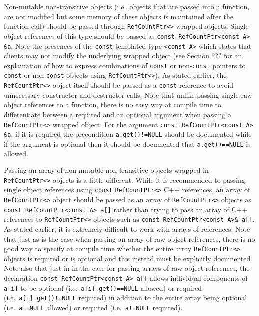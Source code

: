 Non-mutable non-transitive objects (i.e.~objects that are passed into
a function, are not modified but some memory of these objects is
maintained after the function call) should be passed through
{}\texttt{Ref\-Count\-Ptr<>} wrapped objects.  Single object
references of this type should be passed as {}\texttt{const
Ref\-Count\-Ptr<const A> \&a}.  Note the presences of the
{}\texttt{const} templated type {}\texttt{<const A>} which states that
clients may not modify the underlying wrapped object (see Section ???
for an explaination of how to express combinations of {}\texttt{const}
or non-{}\texttt{const} pointers to {}\texttt{const} or
non-{}\texttt{const} objects using {}\texttt{Ref\-Count\-Ptr<>}).  As
stated earlier, the {}\texttt{Ref\-Count\-Ptr<>} object itself should
be passed as a {}\texttt{const} reference to avoid unnecessary
constructor and destructor calls.  Note that unlike passing single raw
object references to a function, there is no easy way at compile time
to differentiate between a required and an optional argument when
passing a {}\texttt{Ref\-Count\-Ptr<>} wrapped object.  For the
argument {}\texttt{const Ref\-Count\-Ptr<const A> \&a}, if it is
required the precondition {}\texttt{a.get()!=NULL} should be
documented while if the argument is optional then it should be
documented that {}\texttt{a.get()==NULL} is allowed.

Passing an array of non-mutable non-transitive objects wrapped in
{}\texttt{Ref\-Count\-Ptr<>} objects is a little different.  While it
is recommended to passing single object references using
{}\texttt{const} {}\texttt{Ref\-Count\-Ptr<>} C++ references, an array
of {}\texttt{Ref\-Count\-Ptr<>} object should be passed as an array of
{}\texttt{Ref\-Count\-Ptr<>} objects as {}\texttt{const
Ref\-Count\-Ptr<const A> a[]} rather than trying to pass an array of
C++ references to {}\texttt{Ref\-Count\-Ptr<>} objects such as
{}\texttt{const Ref\-Count\-Ptr<const A>\& a[]}.  As stated earlier,
it is extremely difficult to work with arrays of references.  Note
that just as is the case when passing an array of raw object
references, there is no good way to specify at compile time whether
the entire array {}\texttt{Ref\-Count\-Ptr<>} objects is required or
is optional and this instead must be explicitly documented.  Note also
that just in in the case for passing arrays of raw object references,
the declaration {}\texttt{const Ref\-Count\-Ptr<const A> a[]} allows
individual components of {}\texttt{a[i]} to be optional
(i.e.~{}\texttt{a[i].get()==NULL} allowed) or required
(i.e.~{}\texttt{a[i].get()!=NULL} required) in addition to the entire
array being optional (i.e.~{}\texttt{a==NULL} allowed) or required
(i.e.~{}\texttt{a!=NULL} required).

